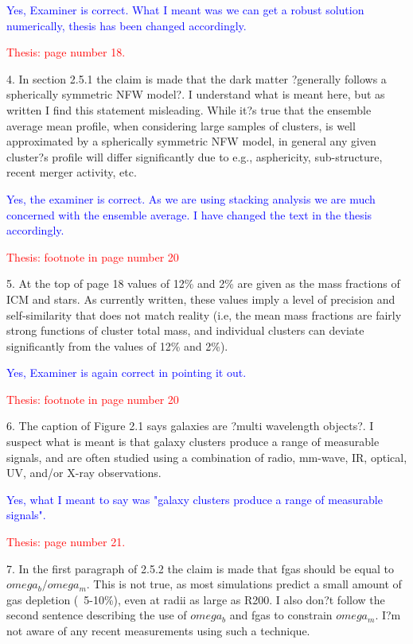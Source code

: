 \documentclass[11pt,a4paper]{article}
\begin{document}
\textcolor{blue}{Yes, Examiner is correct. What I meant was we can get a robust solution numerically, thesis has been changed accordingly.}

\textcolor{red}{Thesis: page number 18.}

4. In section 2.5.1 the claim is made that the dark matter ?generally follows a
spherically symmetric NFW model?. I understand what is meant here, but as
written I find this statement misleading. While it?s true that the ensemble average
mean profile, when considering large samples of clusters, is well approximated
by a spherically symmetric NFW model, in general any given cluster?s profile will
differ significantly due to e.g., asphericity, sub-structure, recent merger activity,
etc.

\textcolor{blue}{Yes, the examiner is correct. As we are using stacking analysis we are much concerned with the ensemble average. I have changed the text in the thesis accordingly.}

\textcolor{red}{Thesis: footnote in page number 20}


5. At the top of page 18 values of 12\% and 2\% are given as the mass fractions of
ICM and stars. As currently written, these values imply a level of precision and
self-similarity that does not match reality (i.e, the mean mass fractions are fairly
strong functions of cluster total mass, and individual clusters can deviate
significantly from the values of 12\% and 2\%).

\textcolor{blue}{Yes, Examiner is again correct in pointing it out.}

\textcolor{red}{Thesis: footnote in page number 20}

6. The caption of Figure 2.1 says galaxies are ?multi wavelength objects?. I suspect
what is meant is that galaxy clusters produce a range of measurable signals, and
are often studied using a combination of radio, mm-wave, IR, optical, UV, and/or
X-ray observations.

\textcolor{blue}{Yes, what I meant to say was "galaxy clusters produce a range of measurable signals". }

\textcolor{red}{Thesis: page number 21.}


7. In the first paragraph of 2.5.2 the claim is made that fgas should be equal to
$omega_b/omega_m$. This is not true, as most simulations predict a small amount
of gas depletion (~5-10\%), even at radii as large as R200. I also don?t follow the
second sentence describing the use of $omega_b$ and fgas to constrain
$omega_m$. I?m not aware of any recent measurements using such a technique.
\end{document}
